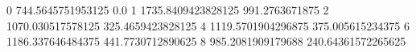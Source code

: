 0 744.5645751953125 0.0
1 1735.8409423828125 991.2763671875
2 1070.030517578125 325.4659423828125
4 1119.5701904296875 375.005615234375
6 1186.337646484375 441.7730712890625
8 985.2081909179688 240.64361572265625

